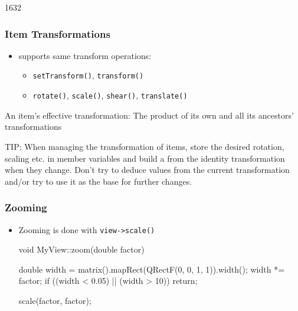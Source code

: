 \begin{slide}{1632}\frametitle{Item Transformations}
\begin{itemize}
\item {} supports same transform operations:

    \begin{itemize}
    \item \texttt{setTransform()}, \texttt{transform()}
    \item \texttt{rotate()}, \texttt{scale()}, \texttt{shear()}, \texttt{translate()} 
    \end{itemize}
\end{itemize}    

\begin{block}{An item's effective transformation:}
The product of its own and all its ancestors' transformations
\end{block}

{\small TIP: When managing the transformation of items, store the desired rotation, scaling etc. in member variables and build a  from the identity transformation when they change. Don't try to deduce values from the current transformation and/or try to use it as the base for further changes.}


\end{slide}


\begin{slide}[fragile]

\frametitle{Zooming}
\begin{itemize}
\item Zooming is done with \texttt{view->scale()}
\begin{cpp}
void MyView::zoom(double factor)
{
    double width =
        matrix().mapRect(QRectF(0, 0, 1, 1)).width();
    width *= factor;
    if ((width < 0.05) || (width > 10)) return;

    scale(factor, factor);
}
\end{cpp}
\end{itemize}
\end{slide}



